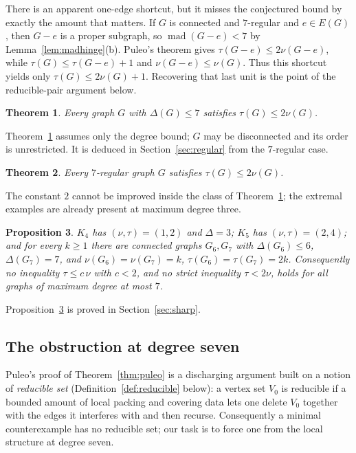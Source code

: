 \documentclass[11pt,a4paper]{amsart}
\theoremstyle{plain}
\newtheorem{theorem}{Theorem}[section]
\newtheorem{proposition}[theorem]{Proposition}
\theoremstyle{definition}
\newcommand{\mad}{\operatorname{mad}}
\begin{document}
There is an apparent one-edge shortcut, but it misses the conjectured bound by
exactly the amount that matters. If $G$ is connected and $7$-regular and
$e\in E(G)$, then $G-e$ is a proper subgraph, so
$\mad(G-e)<7$ by Lemma~\ref{lem:madhinge}(b). Puleo's theorem gives
$\tau(G-e)\le2\nu(G-e)$, while
$\tau(G)\le\tau(G-e)+1$ and $\nu(G-e)\le\nu(G)$. Thus this shortcut yields
only $\tau(G)\le2\nu(G)+1$. Recovering that last unit is the point of the
reducible-pair argument below.

\begin{theorem}\label{thm:main}
Every graph $G$ with $\Delta(G)\le 7$ satisfies $\tau(G)\le 2\nu(G)$.
\end{theorem}

Theorem~\ref{thm:main} assumes only the degree bound; $G$ may be disconnected
and its order is unrestricted. It is deduced in Section~\ref{sec:regular}
from the $7$-regular case.

\begin{theorem}\label{thm:regular}
Every $7$-regular graph $G$ satisfies $\tau(G)\le 2\nu(G)$.
\end{theorem}

The constant $2$ cannot be improved inside the class of
Theorem~\ref{thm:main}; the extremal examples are already present at maximum
degree three.

\begin{proposition}\label{prop:sharpintro}
$K_4$ has $(\nu,\tau)=(1,2)$ and $\Delta=3$; $K_5$ has $(\nu,\tau)=(2,4)$;
and for every $k\ge 1$ there are connected graphs $G_6,G_7$ with
$\Delta(G_6)\le 6$, $\Delta(G_7)=7$, and
$\nu(G_6)=\nu(G_7)=k$, $\tau(G_6)=\tau(G_7)=2k$. Consequently no
inequality $\tau\le c\,\nu$ with $c<2$, and no strict inequality
$\tau<2\nu$, holds for all graphs of maximum degree at most $7$.
\end{proposition}

Proposition~\ref{prop:sharpintro} is proved in Section~\ref{sec:sharp}.

\subsection{The obstruction at degree seven}\label{subsec:obstruction}

Puleo's proof of Theorem~\ref{thm:puleo} is a discharging argument built on a
notion of \emph{reducible set} (Definition~\ref{def:reducible} below): a
vertex set $V_0$ is reducible if a bounded amount of local packing and
covering data lets one delete $V_0$ together with the edges it interferes with
and then recurse. Consequently a minimal counterexample has no reducible set;
our task is to force one from the local structure at degree seven.
\end{document}
